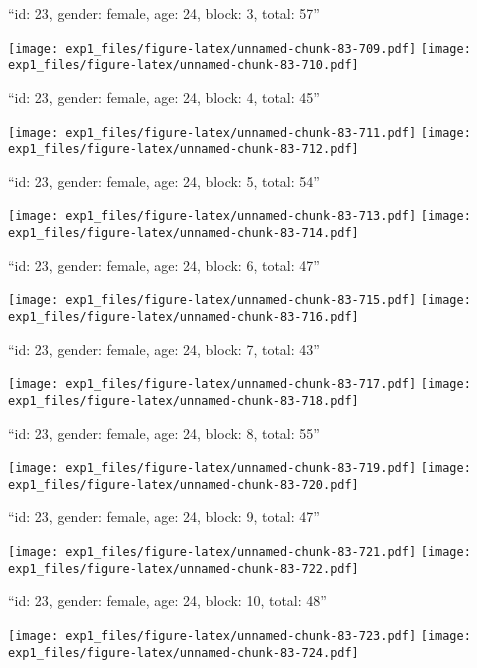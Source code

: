 \documentclass[11pt,,]{article}
\begin{document}
\newpage
[1] 

``id: 23, gender: female, age: 24, block: 3, total: 57''

\texttt{[image: exp1\_files/figure-latex/unnamed-chunk-83-709.pdf]}
\texttt{[image: exp1\_files/figure-latex/unnamed-chunk-83-710.pdf]}

\newpage
[1] 

``id: 23, gender: female, age: 24, block: 4, total: 45''

\texttt{[image: exp1\_files/figure-latex/unnamed-chunk-83-711.pdf]}
\texttt{[image: exp1\_files/figure-latex/unnamed-chunk-83-712.pdf]}

\newpage
[1] 

``id: 23, gender: female, age: 24, block: 5, total: 54''

\texttt{[image: exp1\_files/figure-latex/unnamed-chunk-83-713.pdf]}
\texttt{[image: exp1\_files/figure-latex/unnamed-chunk-83-714.pdf]}

\newpage
[1] 

``id: 23, gender: female, age: 24, block: 6, total: 47''

\texttt{[image: exp1\_files/figure-latex/unnamed-chunk-83-715.pdf]}
\texttt{[image: exp1\_files/figure-latex/unnamed-chunk-83-716.pdf]}

\newpage
[1] 

``id: 23, gender: female, age: 24, block: 7, total: 43''

\texttt{[image: exp1\_files/figure-latex/unnamed-chunk-83-717.pdf]}
\texttt{[image: exp1\_files/figure-latex/unnamed-chunk-83-718.pdf]}

\newpage
[1] 

``id: 23, gender: female, age: 24, block: 8, total: 55''

\texttt{[image: exp1\_files/figure-latex/unnamed-chunk-83-719.pdf]}
\texttt{[image: exp1\_files/figure-latex/unnamed-chunk-83-720.pdf]}

\newpage
[1] 

``id: 23, gender: female, age: 24, block: 9, total: 47''

\texttt{[image: exp1\_files/figure-latex/unnamed-chunk-83-721.pdf]}
\texttt{[image: exp1\_files/figure-latex/unnamed-chunk-83-722.pdf]}

\newpage
[1] 

``id: 23, gender: female, age: 24, block: 10, total: 48''

\texttt{[image: exp1\_files/figure-latex/unnamed-chunk-83-723.pdf]}
\texttt{[image: exp1\_files/figure-latex/unnamed-chunk-83-724.pdf]}
\end{document}
